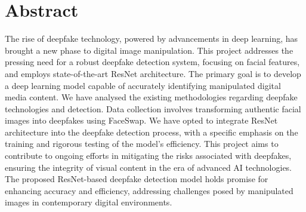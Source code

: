 \chapter*{Abstract}
The rise of deepfake technology, powered by advancements in deep learning, has brought a new phase to digital image manipulation. This project addresses the pressing need for a robust deepfake detection system, focusing on facial features, and employs state-of-the-art ResNet architecture. The primary goal is to develop a deep learning model capable of accurately identifying manipulated digital media content. We have analysed the existing methodologies regarding deepfake technologies and detection. Data collection involves transforming authentic facial images into deepfakes using FaceSwap. We have opted to integrate ResNet architecture into the deepfake detection process, with a specific emphasis on the training and rigorous testing of the model's efficiency. This project aims to contribute to ongoing efforts in mitigating the risks associated with deepfakes, ensuring the integrity of visual content in the era of advanced AI technologies. The proposed ResNet-based deepfake detection model holds promise for enhancing accuracy and efficiency, addressing challenges posed by manipulated images in contemporary digital environments.

